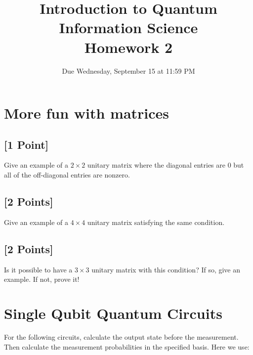 \documentclass[11pt]{article}
\providecommand{\due}{Due Wednesday, September 15 at 11:59 PM}
\begin{document}
\title{Introduction to Quantum Information Science\\Homework 2}
\date{\due}

\maketitle

\section{More fun with matrices}

\subsection{[1 Point]} Give an example of a $2 \times 2$ unitary matrix where the diagonal entries are 0 but all of the off-diagonal entries are nonzero.


\subsection{[2 Points]} Give an example of a $4 \times 4$ unitary matrix satisfying the same condition.

\subsection{[2 Points]} Is it possible to have a $3 \times 3$ unitary matrix with this condition? If so, give an example. If not, prove it!


\section{Single Qubit Quantum Circuits} For the following circuits, calculate the output state before the measurement. Then calculate the measurement probabilities in the specified basis. Here we use:
\end{document}
